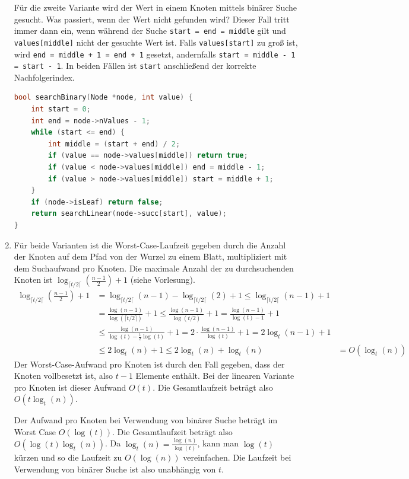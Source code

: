 \documentclass[11pt,a4paper]{article}
\begin{document}
\begin{loesung}
\begin{enumerate}
        Für die zweite Variante wird der Wert in einem Knoten mittels binärer Suche gesucht.
        Was passiert, wenn der Wert nicht gefunden wird?
        Dieser Fall tritt immer dann ein, wenn während der Suche \texttt{start = end = middle} gilt und \texttt{values[middle]} nicht der gesuchte Wert ist.
        Falls \texttt{values[start]} zu groß ist, wird \texttt{end = middle + 1 = end + 1} gesetzt, andernfalls \texttt{start = middle - 1 = start - 1}.
        In beiden Fällen ist \texttt{start} anschließend der korrekte Nachfolgerindex.
        \begin{lstlisting}[language=c++]
bool searchBinary(Node *node, int value) {
    int start = 0;
    int end = node->nValues - 1;
    while (start <= end) {
        int middle = (start + end) / 2;
        if (value == node->values[middle]) return true;
        if (value < node->values[middle]) end = middle - 1;
        if (value > node->values[middle]) start = middle + 1;
    }
    if (node->isLeaf) return false;
    return searchLinear(node->succ[start], value);
}
        \end{lstlisting}

        \item Für beide Varianten ist die Worst-Case-Laufzeit gegeben durch die Anzahl der Knoten auf dem Pfad von der Wurzel zu einem Blatt, multipliziert mit dem Suchaufwand pro Knoten.
        Die maximale Anzahl der zu durchsuchenden Knoten ist $\log_{\lceil t / 2\lceil} \left(\frac{n - 1}{2}\right) + 1$ (siehe Vorlesung).
        \begin{align*}
            \log_{\lceil t / 2\lceil} \left(\frac{n - 1}{2}\right) + 1
            &= \log_{\lceil t / 2\lceil} (n - 1) - \log_{\lceil t / 2\lceil}(2) + 1 
            \leq \log_{\lceil t / 2\lceil} (n - 1) + 1  \\
            &= \frac{\log(n - 1)}{\log(\lceil t / 2\rceil)} + 1
            \leq \frac{\log(n - 1)}{\log(t / 2)} + 1
            = \frac{\log(n - 1)}{\log(t) - 1} + 1 \\
            &\leq \frac{\log(n - 1)}{\log(t) - \frac{1}{2}\log(t)} + 1
            = 2 \cdot \frac{\log(n - 1)}{\log(t)} + 1 = 2\log_t(n - 1) + 1 \\
            &\leq 2\log_t(n) + 1 \leq 2\log_t(n) + \log_t(n)
            &= O(\log_t(n))
        \end{align*}
        Der Worst-Case-Aufwand pro Knoten ist durch den Fall gegeben, dass der Knoten vollbesetzt ist, also $t - 1$ Elemente enthält.
        Bei der linearen Variante pro Knoten ist dieser Aufwand $O(t)$.
        Die Gesamtlaufzeit beträgt also $O(t \log_t(n))$.

        Der Aufwand pro Knoten bei Verwendung von binärer Suche beträgt im Worst Case $O(\log(t))$.
        Die Gesamtlaufzeit beträgt also $O(\log(t) \log_t(n))$.
        Da $\log_t(n) = \frac{\log(n)}{\log(t)}$, kann man $\log(t)$ kürzen und so die Laufzeit zu $O(\log(n))$ vereinfachen.
        Die Laufzeit bei Verwendung von binärer Suche ist also unabhängig von $t$.
    \end{enumerate}
\end{loesung}
\end{document}
